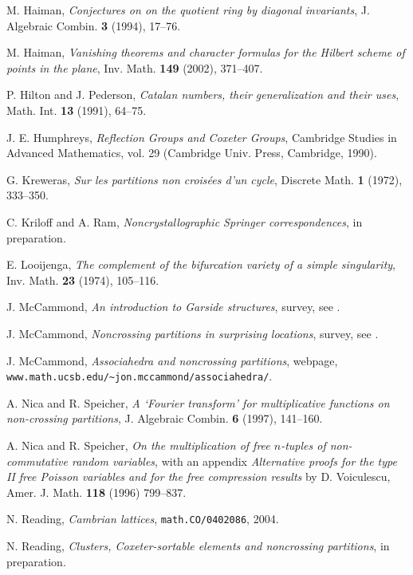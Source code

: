 \documentclass[12pt,letterpaper, reqno]{amsart}
\begin{document}
\begin{thebibliography}{99}
M. Haiman, \emph{Conjectures on  on the quotient ring by diagonal invariants}, J. Algebraic Combin. {\bf 3} (1994), 17--76.

M. Haiman, \emph{Vanishing theorems and character formulas for the Hilbert scheme of points in the plane}, Inv. Math. {\bf 149} (2002), 371--407.

P. Hilton and J. Pederson, \emph{Catalan numbers, their generalization and their uses}, Math. Int. {\bf 13} (1991), 64--75.

J. E. Humphreys, \emph{Reflection Groups and Coxeter Groups}, Cambridge Studies in Advanced Mathematics, vol. 29 (Cambridge Univ. Press, Cambridge, 1990).

G. Kreweras, \emph{Sur les partitions non crois\'ees d'un cycle}, Discrete Math. {\bf 1} (1972), 333--350.

C. Kriloff and A. Ram, \emph{Noncrystallographic Springer correspondences}, in preparation.

E. Looijenga, \emph{The complement of the bifurcation variety of a simple singularity}, Inv. Math. {\bf 23} (1974), 105--116.

J. McCammond, \emph{An introduction to Garside structures}, survey, see \cite{mccammond:webpage}.

J. McCammond, \emph{Noncrossing partitions in surprising locations}, survey, see \cite{mccammond:webpage}.

J. McCammond, \emph{Associahedra and noncrossing partitions}, webpage, \verb+www.math.ucsb.edu/~jon.mccammond/associahedra/+.

A. Nica and R. Speicher, \emph{A `Fourier transform' for multiplicative functions on non-crossing partitions}, J. Algebraic Combin. {\bf 6} (1997), 141--160.

A. Nica and R. Speicher, \emph{On the multiplication of free $n$-tuples of non-commutative random variables}, with an appendix {\em Alternative proofs for the type II free Poisson variables and for the free compression results} by D. Voiculescu, Amer. J. Math. {\bf 118} (1996) 799--837.

N. Reading, \emph{Cambrian lattices}, \texttt{math.CO/0402086}, 2004.

N. Reading, \emph{Clusters, Coxeter-sortable elements and noncrossing partitions}, in preparation.


\end{thebibliography}
\end{document}
